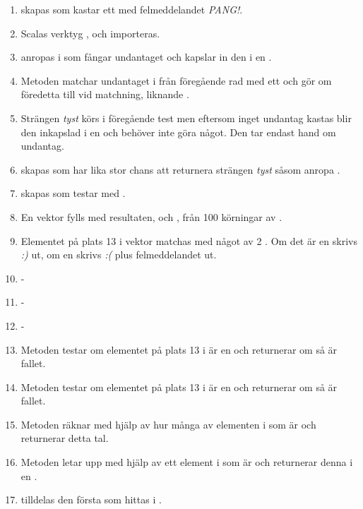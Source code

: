 \SubtaskSolved  \begin{enumerate}
\item {} skapas som kastar ett  med felmeddelandet \textit{PANG!}.
\item Scalas verktyg ,  och  importeras.
\item {} anropas i  som fångar undantaget och kapslar in den i en .
\item Metoden  matchar undantaget i  från föregående rad med ett  och gör om föredetta  till  vid matchning, liknande .
\item Strängen \textit{tyst} körs i föregående test men eftersom inget undantag kastas blir den inkapslad i en  och  behöver inte göra något. Den tar endast hand om undantag.
\item {} skapas som har lika stor chans att returnera strängen \textit{tyst} såsom anropa .
\item {} skapas som testar  med .
\item En vektor  fylls med resultaten,  och , från 100 körningar av .
\item Elementet på plats 13 i vektor  matchas med något av 2 . Om det är en  skrivs \textit{:)} ut, om en  skrivs \textit{:(} plus felmeddelandet ut.
\item -
\item -
\item -
\item Metoden  testar om elementet på plats 13 i  är en  och returnerar  om så är fallet.
\item Metoden  testar om elementet på plats 13 i  är en  och returnerar  om så är fallet.
\item Metoden  räknar med hjälp av  hur många av elementen i  som är  och returnerar detta tal.
\item Metoden  letar upp med hjälp av  ett element i  som är  och returnerar denna i en .
\item {} tilldelas den första  som hittas i .

\end{enumerate}
